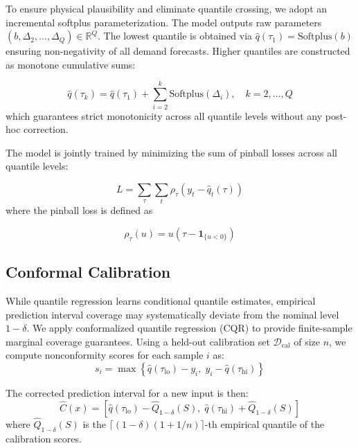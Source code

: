 \documentclass[conference]{IEEEtran}
\begin{document}
To ensure physical plausibility and eliminate quantile crossing, we adopt an incremental softplus parameterization. The model outputs raw parameters $(b, \Delta_2, \ldots, \Delta_Q) \in \mathbb{R}^Q$. The lowest quantile is obtained via $\hat{q}(\tau_1) = \mathrm{Softplus}(b)$ ensuring non-negativity of all demand forecasts. Higher quantiles are constructed as monotone cumulative sums:

\begin{equation}
 \hat{q}(\tau_k) = \hat{q}(\tau_1) + \sum_{i=2}^{k} \mathrm{Softplus}(\Delta_i), \quad k = 2, \ldots, Q
\end{equation}
which guarantees strict monotonicity across all quantile levels without any post-hoc correction.

The model is jointly trained by minimizing the sum of pinball losses across all quantile levels:

\begin{equation}
    L = \sum_{\tau} \sum_{t} \rho_{\tau}(y_t - \hat{q}_t(\tau))
\end{equation}
%
where the pinball loss is defined as

\begin{equation}
    \rho_{\tau}(u) = u \left( \tau - \mathbf{1}_{\{u < 0\}} \right)
\end{equation}




\subsection{Conformal Calibration}

While quantile regression learns conditional quantile estimates, empirical prediction interval coverage may systematically deviate from the nominal level $1 - \delta$. We apply conformalized quantile regression (CQR) to provide finite-sample marginal coverage guarantees. Using a held-out calibration set $\mathcal{D}_{\mathrm{cal}}$ of size $n$, we compute nonconformity scores for each sample $i$ as:
\begin{equation}
s_i = \max \left\{ \hat{q}(\tau_{\mathrm{lo}}) - y_i,\; y_i - \hat{q}(\tau_{\mathrm{hi}}) \right\}
\end{equation}

The corrected prediction interval for a new input is then:
\begin{equation}
\hat{C}(x) = 
\left[
\hat{q}(\tau_{\mathrm{lo}}) - \hat{Q}_{1-\delta}(S),\;
\hat{q}(\tau_{\mathrm{hi}}) + \hat{Q}_{1-\delta}(S)
\right]
\end{equation}
where $\hat{Q}_{1-\delta}(S)$ is the $\lceil (1-\delta)(1 + 1/n) \rceil$-th empirical quantile of the calibration scores.
\end{document}
